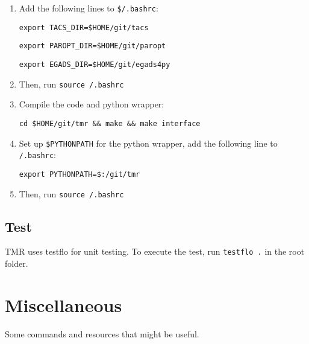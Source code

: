 \documentclass{article}
\begin{document}
\begin{enumerate}

    \item Add the following lines to \texttt{\$\texttildelow/.bashrc}:

    \texttt{export TACS\string_DIR=\$HOME/git/tacs}

    \texttt{export PAROPT\string_DIR=\$HOME/git/paropt}

    \texttt{export EGADS\string_DIR=\$HOME/git/egads4py}

    \item Then, run \texttt{source \texttildelow/.bashrc}

    \item Compile the code and python wrapper:

    \texttt{cd \$HOME/git/tmr \&\& make \&\& make interface}

    \item Set up \texttt{\$PYTHONPATH} for the python wrapper,
    add the following line to \texttt{\texttildelow/.bashrc}:

    \texttt{export PYTHONPATH=\$:\texttildelow/git/tmr}

    \item Then, run \texttt{source \texttildelow/.bashrc}

\end{enumerate}

\subsection{Test}

TMR uses testflo for unit testing.
To execute the test, run \texttt{testflo .} in the root folder.

\section{Miscellaneous}

Some commands and resources that might be useful.
\end{document}
